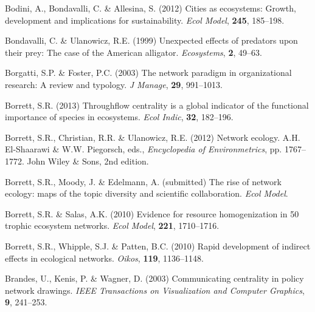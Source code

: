 \documentclass[11pt]{article}
\begin{document}
\begin{thebibliography}{79}
Bodini, A., Bondavalli, C. \& Allesina, S. (2012) Cities as ecosystems: Growth,
  development and implications for sustainability.
\newblock \emph{Ecol Model}, \textbf{245}, 185--198.

Bondavalli, C. \& Ulanowicz, R.E. (1999) Unexpected effects of predators upon
  their prey: {T}he case of the {A}merican alligator.
\newblock \emph{Ecosystems}, \textbf{2}, 49--63.

Borgatti, S.P. \& Foster, P.C. (2003) The network paradigm in organizational
  research: A review and typology.
\newblock \emph{J Manage}, \textbf{29}, 991--1013.

Borrett, S.R. (2013) Throughflow centrality is a global indicator of the
  functional importance of species in ecosystems.
\newblock \emph{Ecol Indic}, \textbf{32}, 182--196.

Borrett, S.R., Christian, R.R. \& Ulanowicz, R.E. (2012) Network ecology.
\newblock A.H. El-Shaarawi \& W.W. Piegorsch, eds., \emph{Encyclopedia of
  Environmetrics}, pp. 1767--1772. John Wiley \& Sons, 2nd edition.

Borrett, S.R., Moody, J. \& Edelmann, A. (submitted) The rise of network
  ecology: maps of the topic diversity and scientific collaboration.
\newblock \emph{Ecol Model}.

Borrett, S.R. \& Salas, A.K. (2010) Evidence for resource homogenization in 50
  trophic ecosystem networks.
\newblock \emph{Ecol Model}, \textbf{221}, 1710--1716.

Borrett, S.R., Whipple, S.J. \& Patten, B.C. (2010) Rapid development of
  indirect effects in ecological networks.
\newblock \emph{Oikos}, \textbf{119}, 1136--1148.

Brandes, U., Kenis, P. \& Wagner, D. (2003) Communicating centrality in policy
  network drawings.
\newblock \emph{IEEE Transactions on Visualization and Computer Graphics},
  \textbf{9}, 241--253.


\end{thebibliography}
\end{document}
